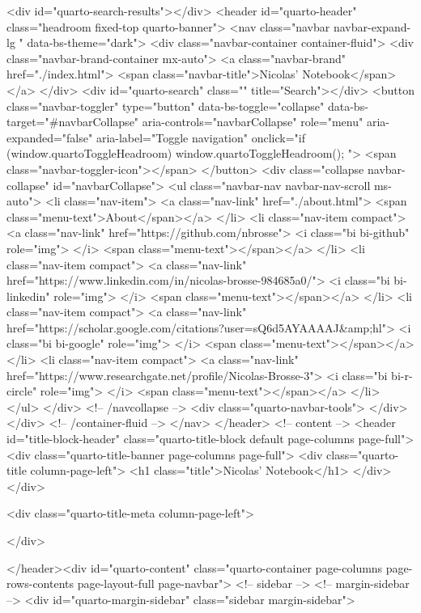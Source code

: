 <div id="quarto-search-results"></div>
  <header id="quarto-header" class="headroom fixed-top quarto-banner">
    <nav class="navbar navbar-expand-lg " data-bs-theme="dark">
      <div class="navbar-container container-fluid">
      <div class="navbar-brand-container mx-auto">
    <a class="navbar-brand" href="./index.html">
    <span class="navbar-title">Nicolas’ Notebook</span>
    </a>
  </div>
            <div id="quarto-search" class="" title="Search"></div>
          <button class="navbar-toggler" type="button" data-bs-toggle="collapse" data-bs-target="#navbarCollapse" aria-controls="navbarCollapse" role="menu" aria-expanded="false" aria-label="Toggle navigation" onclick="if (window.quartoToggleHeadroom) { window.quartoToggleHeadroom(); }">
  <span class="navbar-toggler-icon"></span>
</button>
          <div class="collapse navbar-collapse" id="navbarCollapse">
            <ul class="navbar-nav navbar-nav-scroll ms-auto">
  <li class="nav-item">
    <a class="nav-link" href="./about.html"> 
<span class="menu-text">About</span></a>
  </li>  
  <li class="nav-item compact">
    <a class="nav-link" href="https://github.com/nbrosse"> <i class="bi bi-github" role="img">
</i> 
<span class="menu-text"></span></a>
  </li>  
  <li class="nav-item compact">
    <a class="nav-link" href="https://www.linkedin.com/in/nicolas-brosse-984685a0/"> <i class="bi bi-linkedin" role="img">
</i> 
<span class="menu-text"></span></a>
  </li>  
  <li class="nav-item compact">
    <a class="nav-link" href="https://scholar.google.com/citations?user=sQ6d5AYAAAAJ&amp;hl"> <i class="bi bi-google" role="img">
</i> 
<span class="menu-text"></span></a>
  </li>  
  <li class="nav-item compact">
    <a class="nav-link" href="https://www.researchgate.net/profile/Nicolas-Brosse-3"> <i class="bi bi-r-circle" role="img">
</i> 
<span class="menu-text"></span></a>
  </li>  
</ul>
          </div> <!-- /navcollapse -->
            <div class="quarto-navbar-tools">
</div>
      </div> <!-- /container-fluid -->
    </nav>
</header>
<!-- content -->
<header id="title-block-header" class="quarto-title-block default page-columns page-full">
  <div class="quarto-title-banner page-columns page-full">
    <div class="quarto-title column-page-left">
      <h1 class="title">Nicolas’ Notebook</h1>
                      </div>
  </div>
    
  
  <div class="quarto-title-meta column-page-left">

      
    
      
    </div>
    
  
  </header><div id="quarto-content" class="quarto-container page-columns page-rows-contents page-layout-full page-navbar">
<!-- sidebar -->
<!-- margin-sidebar -->
    <div id="quarto-margin-sidebar" class="sidebar margin-sidebar">
        
